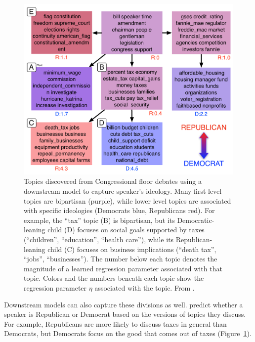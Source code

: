 \begin{figure}[ht]
  \begin{minipage}[c]{0.62\textwidth}
  	\vspace{-.3cm}
    \includegraphics[width=\textwidth]{figures/ideology_topics_vert}
  \end{minipage}\hfill
  \begin{minipage}[c]{0.36\textwidth}
    \caption{
       \small Topics discovered from Congressional floor debates using
       a downstream model to capture speaker's ideology.  Many
    first-level topics are bipartisan (purple), while lower level topics are
    associated with specific ideologies (Democrats blue, Republicans red). For example,
    	the ``tax'' topic (B) is bipartisan, but its Democratic-leaning child (D) focuses on
    	social goals supported by taxes (``children'', ``education'', ``health care''), while
    	its Republican-leaning child (C) focuses on business implications (``death tax'', ``jobs'',
    	``businesses'').  The number below each
    topic denotes the magnitude of a learned regression parameter associated
    with that topic.  Colors and the numbers beneath each topic show the
    regression parameter $\eta$ associated with the topic.  From \citet{nguyen-13:shlda}.
    } \label{fig:shlda-taxes}
  \end{minipage}
  \vspace{-.3cm}
\end{figure}

Downstream models can also capture these divisions as well.
\citet{nguyen-13:shlda} predict whether a speaker is Republican or
Democrat based on the versions of topics they discuss.  For example,
Republicans are more likely to discuss taxes in general than
Democrats, but Democrats focus on the good that comes out of taxes
(Figure~\ref{fig:shlda-taxes}).

